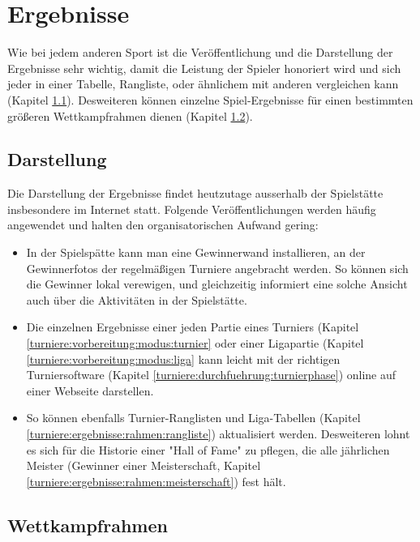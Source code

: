 \section{Ergebnisse}
\label{turniere:ergebnisse}

Wie bei jedem anderen Sport ist die Veröffentlichung und die Darstellung der Ergebnisse sehr wichtig, damit die Leistung der Spieler honoriert wird und sich jeder in einer Tabelle, Rangliste, oder ähnlichem mit anderen vergleichen kann (Kapitel \ref{turniere:ergebnisse:formate}). 
Desweiteren können einzelne Spiel-Ergebnisse für einen bestimmten größeren Wettkampfrahmen dienen (Kapitel \ref{turniere:ergebnisse:rahmen}).

\subsection{Darstellung}
\label{turniere:ergebnisse:formate}

Die Darstellung der Ergebnisse findet heutzutage ausserhalb der Spielstätte insbesondere im Internet statt. Folgende Veröffentlichungen werden häufig angewendet und halten den organisatorischen Aufwand gering:
\begin{itemize}
\item In der Spielspätte kann man eine Gewinnerwand installieren, an der Gewinnerfotos der regelmäßigen Turniere angebracht werden. So können sich die Gewinner lokal verewigen, und gleichzeitig informiert eine solche Ansicht auch über die Aktivitäten in der Spielstätte. 
\item Die einzelnen Ergebnisse einer jeden Partie eines Turniers (Kapitel \ref{turniere:vorbereitung:modus:turnier} oder einer Ligapartie (Kapitel \ref{turniere:vorbereitung:modus:liga} kann leicht mit der richtigen Turniersoftware (Kapitel \ref{turniere:durchfuehrung:turnierphase}) online auf einer Webseite darstellen.
\item So können ebenfalls Turnier-Ranglisten und Liga-Tabellen (Kapitel \ref{turniere:ergebnisse:rahmen:rangliste}) aktualisiert werden. Desweiteren lohnt es sich für die Historie einer "Hall of Fame" zu pflegen, die alle jährlichen Meister (Gewinner einer Meisterschaft, Kapitel \ref{turniere:ergebnisse:rahmen:meisterschaft}) fest hält.  
\end{itemize}

\subsection{Wettkampfrahmen}
\label{turniere:ergebnisse:rahmen}

